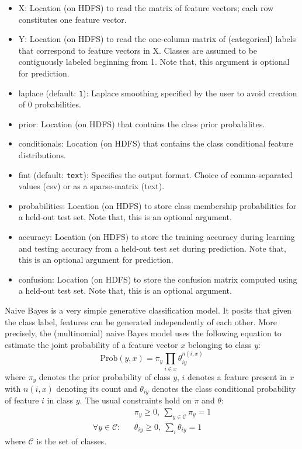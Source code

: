 \begin{itemize}
\item X: Location (on HDFS) to read the matrix of feature vectors; 
each row constitutes one feature vector.
\item Y: Location (on HDFS) to read the one-column matrix of (categorical) 
labels that correspond to feature vectors in X. Classes are assumed to be
contiguously labeled beginning from 1. Note that, this argument is optional
for prediction.
\item laplace (default: {\tt 1}): Laplace smoothing specified by the 
user to avoid creation of 0 probabilities.
\item prior: Location (on HDFS) that contains the class prior probabilites.
\item conditionals: Location (on HDFS) that contains the class conditional
feature distributions.
\item fmt (default: {\tt text}): Specifies the output format. Choice of 
comma-separated values (csv) or as a sparse-matrix (text).
\item probabilities: Location (on HDFS) to store class membership probabilities
for a held-out test set. Note that, this is an optional argument.
\item accuracy: Location (on HDFS) to store the training accuracy during
learning and testing accuracy from a held-out test set during prediction. 
Note that, this is an optional argument for prediction.
\item confusion: Location (on HDFS) to store the confusion matrix
computed using a held-out test set. Note that, this is an optional 
argument.
\end{itemize}


Naive Bayes is a very simple generative classification model. It posits that 
given the class label, features can be generated independently of each other.
More precisely, the (multinomial) naive Bayes model uses the following 
equation to estimate the joint probability of a feature vector $x$ belonging 
to class $y$:
\begin{equation*}
\text{Prob}(y, x) = \pi_y \prod_{i \in x} \theta_{iy}^{n(i,x)}
\end{equation*}
where $\pi_y$ denotes the prior probability of class $y$, $i$ denotes a feature
present in $x$ with $n(i,x)$ denoting its count and $\theta_{iy}$ denotes the 
class conditional probability of feature $i$ in class $y$. The usual 
constraints hold on $\pi$ and $\theta$:
\begin{eqnarray*}
&& \pi_y \geq 0, ~ \sum_{y \in \mathcal{C}} \pi_y = 1\\
\forall y \in \mathcal{C}: && \theta_{iy} \geq 0, ~ \sum_i \theta_{iy} = 1
\end{eqnarray*}
where $\mathcal{C}$ is the set of classes.

